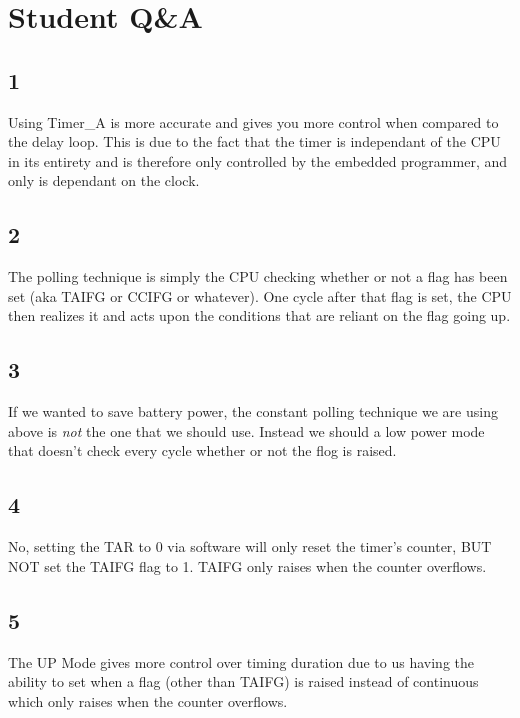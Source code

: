 \documentclass{article}
\begin{document}
\section{Student Q\&A}
\subsection{1}
Using Timer\_A is more accurate and gives you more control when compared to the delay loop. This is due to the fact that the timer is independant of the CPU in its entirety and is therefore only controlled by the embedded programmer, and only is dependant on the clock. 

\subsection{2}
The polling technique is simply the CPU checking whether or not a flag has been set (aka TAIFG or CCIFG or whatever). One cycle after that flag is set, the CPU then realizes it and acts upon the conditions that are reliant on the flag going up.

\subsection{3}
If we wanted to save battery power, the constant polling technique we are using above is \textit{not} the one that we should use. Instead we should a low power mode that doesn't check every cycle whether or not the flog is raised.

\subsection{4}
No, setting the TAR to 0 via software will only reset the timer's counter, BUT NOT set the TAIFG flag to 1. TAIFG only raises when the counter overflows.

\subsection{5}
The UP Mode gives more control over timing duration due to us having the ability to set when a flag (other than TAIFG) is raised instead of continuous which only raises when the counter overflows.
\end{document}
